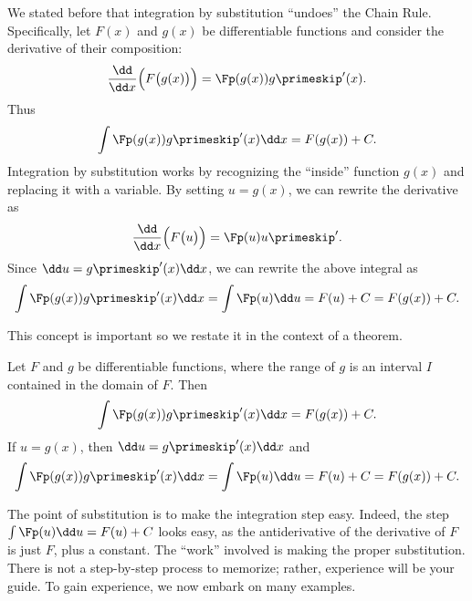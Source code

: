 We stated before that integration by substitution ``undoes'' the Chain Rule. Specifically, let $F(x)$ and $g(x)$ be differentiable functions and consider the derivative of their composition:
\[\frac{\dd}{\dd x}\Bigl(F\bigl(g(x)\bigr)\Bigr) = \Fp(g(x))g\primeskip'(x).\]
Thus\vspace{-.3\baselineskip}
\[\int \Fp(g(x))g\primeskip'(x)\dd x = F(g(x)) + C.\]
Integration by substitution works by recognizing the ``inside'' function $g(x)$ and replacing it with a variable. By setting $u=g(x)$, we can rewrite the derivative as\vspace{-.3\baselineskip}
\[\frac{\dd}{\dd x}\Bigl(F\bigl(u\bigr)\Bigr) = \Fp(u)u\primeskip'.\]
Since $\dd u = g\primeskip'(x)\dd x$, we can rewrite the above integral as
\[\int \Fp(g(x))g\primeskip'(x)\dd x = \int \Fp(u) \dd u = F(u)+C = F(g(x))+ C.\]
	
This concept is important so we restate it in the context of a theorem.

\begin{theorem}\label{thm:subst}
Let $F$ and $g$ be differentiable functions, where the range of $g$ is an interval $I$ contained in the domain of $F$. Then 
\[\int \Fp(g(x))g\primeskip'(x)\dd x = F(g(x)) + C.\]
If $u = g(x)$, then $\dd u = g\primeskip'(x)\dd x$ and 
\[\int \Fp(g(x))g\primeskip'(x)\dd x = \int \Fp(u)\dd u = F(u)+C = F(g(x))+C.\]
\end{theorem}

The point of substitution is to make the integration step easy. Indeed, the step $\int \Fp(u)\dd u = F(u) + C$ looks easy, as the antiderivative of the derivative of $F$ is just $F$, plus a constant. The ``work'' involved is making the proper substitution. There is not a step-by-step process to memorize; rather, experience will be your guide. To gain experience, we now embark on many examples.


